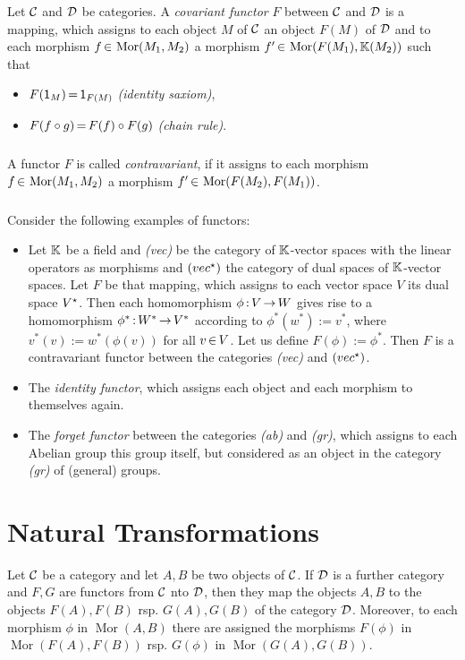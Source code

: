 \documentclass[11pt,twoside]{article}
\begin{document}
\begin{definition} %
Let $\cal{C}$ and $\cal{D}$ be categories.
A \textit{covariant functor} $F$ bet\-ween $\cal{C}$ and $\cal{D}$ 
is a mapping,
which assigns
to each object $M$ of $\cal{C}$ an object $F(M)$ of $\cal{D}$ and
to each morphism $f \xeof \operatorname{Mor}(M_1,M_2)$ a morphism 
$f' \xeof \operatorname{Mor}(F(M_1),\F(M_2))$
such that 

\begin{itemize}[leftmargin=22pt]
\item[(F-1)] $F(\1_M) \eq \1_{F(M)}$ \textit{(identity saxiom)},
\item[(F-2)] $F(f \circ g) \eq F(f) \circ F(g)$ \textit{(chain rule)}.
\end{itemize}

\subparagraph{}
A functor $F$ is called \textit{contravariant},
if it assigns to each morphism $f \xeof \operatorname{Mor}(M_1,M_2)$
a morphism $f' \xeof \operatorname{Mor}(F(M_2),F(M_1))$.
\end{definition}

\subparagraph{}
Consider the following examples of functors:

\begin{itemize}
\item[1.]
Let $\F$ be a field and \textit{(vec)} be the category of $\F$-vector spaces
with the linear operators as morphisms
and $(vec^{\*})$ the category of dual spaces of $\F$-vector spaces.
Let $F$ be that mapping,
which assigns to each vector space $V$ its dual space $V^\*$.
Then each homomorphism $\phi \: V \xto W$ gives rise
to a homomorphism $\phi^* \: W^* \xto V^*$
according to $\phi^* (w^*) := v^*$,
where $v^*(v) := w^*(\phi(v))$ for all $v \xeof V$.
Let us define $F(\phi) := \phi^*$.
Then $F$ is a contravariant functor between the categories \textit{(vec)}
and $(vec^{\*})$.

\item[2.]
The \textit{identity functor},
which assigns each object and each morphism to themselves again.

\item[3.]
The \textit{forget functor} between the categories \textit{(ab)} and \textit{(gr)},
which assigns to each Abelian group this group itself,
but considered as an object in the category \textit{(gr)} of (general) groups.
\end{itemize}

\section{Natural Transformations}
Let $\cal{C}$ be a category and let $A,B$ be two objects of $\cal{C}$.
If $\cal{D}$ is a further category and $F,G$ are functors
from $\cal{C}$ nto $\cal{D}$,
then they map the objects $A,B$ to the objects $F(A),F(B)$
rsp. $G(A),G(B)$ of the category $\cal{D}$.
Moreover,
to each morphism $\phi$ in $\operatorname{Mor}(A,B)$
there are assigned the morphisms $F(\phi)$ in $\operatorname{Mor}(F(A),F(B))$ rsp.
$G(\phi)$ in $\operatorname{Mor}(G(A),G(B))$.
\end{document}
